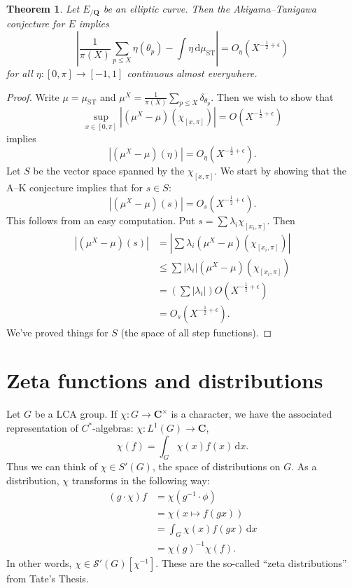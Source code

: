 \documentclass{article}
\DeclareMathOperator{\ST}{ST}
\newcommand{\bC}{\mathbf{C}}
\newcommand{\bQ}{\mathbf{Q}}
\newcommand{\cS}{\mathcal{S}}
\newcommand{\dd}{\mathrm{d}}
\newtheorem{theorem}{Theorem}
\numberwithin{theorem}{section}
\begin{document}
\begin{theorem}
Let $E_{/\bQ}$ be an elliptic curve. Then the Akiyama--Tanigawa conjecture for 
$E$ implies 
\[
	\left| \frac{1}{\pi(X)} \sum_{p\leqslant X} \eta(\theta_p) - \int \eta\, \dd \mu_{\ST}\right| = O_\eta(X^{-\frac 1 2+\epsilon})
\]
for all $\eta\colon [0,\pi] \to [-1,1]$ continuous almost everywhere. 
\end{theorem}
\begin{proof}
Write $\mu=\mu_{\ST}$ and 
$\mu^X = \frac{1}{\pi(X)} \sum_{p\leqslant X} \delta_{\theta_p}$. Then we wish 
to show that 
\[
	\sup_{x\in [0,\pi]} |(\mu^X-\mu)(\chi_{[x,\pi]})| = O(X^{-\frac 1 2+\epsilon})
\]
implies 
\[
	|(\mu^X-\mu)(\eta)| = O_\eta(X^{-\frac 1 2+\epsilon}) .
\]
Let $S$ be the vector space spanned by the $\chi_{[x,\pi]}$. We start by 
showing that the A--K conjecture implies that for $s\in S$:
\[
	|(\mu^X-\mu)(s)| = O_s(X^{-\frac 1 2+\epsilon}) .
\]
This follows from an easy computation. Put $s=\sum \lambda_i \chi_{[x_i,\pi]}$. 
Then 
\begin{align*}
	|(\mu^X-\mu)(s)| 
		&= \left| \sum \lambda_i (\mu^X-\mu)(\chi_{[x_i,\pi]})\right| \\
		&\leqslant \sum |\lambda_i| (\mu^X-\mu)(\chi_{[x_i,\pi]}) \\
		&= \left(\sum |\lambda_i|\right) O(X^{-\frac 1 2+\epsilon}) \\
		&= O_s(X^{-\frac 1 2 +\epsilon}) .
\end{align*}
We've proved things for $S$ (the space of all step functions). 
\end{proof}





\section{Zeta functions and distributions}

Let $G$ be a LCA group. If $\chi\colon G\to \bC^\times$ is a character, we 
have the associated representation of $C^\ast$-algebras: 
$\chi\colon L^1(G) \to \bC$,  
\[
	\chi(f) = \int_G \chi(x) f(x)\, \dd x .
\]
Thus we can think of $\chi\in S'(G)$, the space of distributions on $G$. As a 
distribution, $\chi$ transforms in the following way:
\begin{align*}
	(g\cdot \chi)f &= \chi(g^{-1}\cdot \phi) \\
		&= \chi(x\mapsto f(g x)) \\
		&= \int_G \chi(x) f(g x)\, \dd x \\
&= \chi(g)^{-1} \chi(f) .
\end{align*}
In other words, $\chi\in \cS'(G)[\chi^{-1}]$. These are the so-called ``zeta 
distributions'' from Tate's Thesis. 
\end{document}
